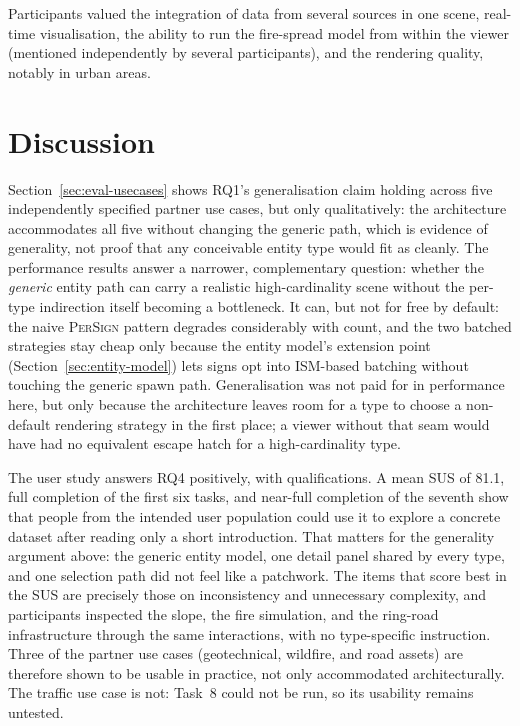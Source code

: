 Participants valued the integration of data from several sources in one scene, real-time visualisation, the ability to run the fire-spread model from within the viewer (mentioned independently by several participants), and the rendering quality, notably in urban areas.
\section{Discussion}
\label{sec:eval-discussion}

Section~\ref{sec:eval-usecases} shows RQ1's generalisation claim holding across five independently specified partner use cases, but only qualitatively: the architecture accommodates all five without changing the generic path, which is evidence of generality, not proof that any conceivable entity type would fit as cleanly. The performance results answer a narrower, complementary question: whether the \emph{generic} entity path can carry a realistic high-cardinality scene without the per-type indirection itself becoming a bottleneck. It can, but not for free by default: the naive \textsc{PerSign} pattern degrades considerably with count, and the two batched strategies stay cheap only because the entity model's extension point (Section~\ref{sec:entity-model}) lets signs opt into ISM-based batching without touching the generic spawn path. Generalisation was not paid for in performance here, but only because the architecture leaves room for a type to choose a non-default rendering strategy in the first place; a viewer without that seam would have had no equivalent escape hatch for a high-cardinality type.

The user study answers RQ4 positively, with qualifications. A mean SUS of 81.1, full completion of the first six tasks, and near-full completion of the seventh show that people from the intended user population could use it to explore a concrete dataset after reading only a short introduction. That matters for the generality argument above: the generic entity model, one detail panel shared by every type, and one selection path did not feel like a patchwork. The items that score best in the SUS are precisely those on inconsistency and unnecessary complexity, and participants inspected the slope, the fire simulation, and the ring-road infrastructure through the same interactions, with no type-specific instruction. Three of the partner use cases (geotechnical, wildfire, and road assets) are therefore shown to be usable in practice, not only accommodated architecturally. The traffic use case is not: Task~8 could not be run, so its usability remains untested.


